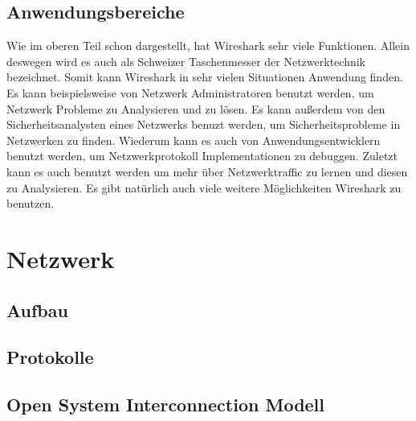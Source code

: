 \documentclass[12pt]{article}
\begin{document}
\subsection{Anwendungsbereiche}
Wie im oberen Teil schon dargestellt, hat Wireshark sehr viele Funktionen. Allein deswegen wird es auch als Schweizer Taschenmesser der Netzwerktechnik bezeichnet. Somit kann Wireshark in sehr vielen Situationen Anwendung finden. Es kann beispielsweise von Netzwerk Administratoren benutzt werden, um Netzwerk Probleme  zu Analysieren und zu lösen. Es kann außerdem von den Sicherheitsanalysten eines Netzwerks benuzt werden, um Sicherheitsprobleme in Netzwerken zu finden. Wiederum kann es auch von Anwendungsentwicklern benutzt werden, um Netzwerkprotokoll Implementationen zu debuggen. Zuletzt kann es auch benutzt werden um mehr über Netzwerktraffic zu lernen und diesen zu Analysieren. Es gibt natürlich auch viele weitere Möglichkeiten Wireshark zu benutzen. \cite{intendedpurposes}

\newpage





\section{Netzwerk}

\subsection{Aufbau}
\subsection{Protokolle}

\subsection{Open System Interconnection Modell}
\end{document}
